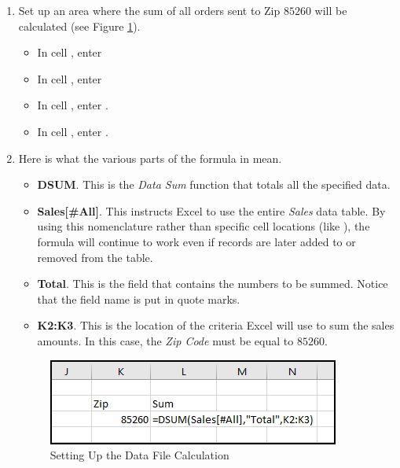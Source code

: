 \begin{enumerate}[resume]
	\item Set up an area where the sum of all orders sent to Zip $ 85260 $ will be calculated (see Figure \ref{09:fig21}).

	\begin{itemize}
		\item In cell , enter 
		\item In cell , enter 
		\item In cell , enter  . 
		\item In cell , enter . 
	\end{itemize}

	\item Here is what the various parts of the formula in  mean.		

	\begin{itemize}
		\item \textbf{DSUM}. This is the \textit{Data Sum} function that totals all the specified data.
		\item \textbf{Sales[\#All]}. This instructs Excel to use the entire \textit{Sales} data table. By using this nomenclature rather than specific cell locations (like ), the formula will continue to work even if records are later added to or removed from the table.
		\item \textbf{Total}. This is the field that contains the numbers to be summed. Notice that the field name is put in quote marks.
		\item \textbf{K2:K3}. This is the location of the criteria Excel will use to sum the sales amounts. In this case, the \textit{Zip Code} must be equal to $ 85260 $.
	\end{itemize}	

	\begin{figure}[H]
		\centering
		\includegraphics[width=\maxwidth{.75\linewidth}]{gfx/ch09_fig21}
		\caption{Setting Up the Data File Calculation}
		\label{09:fig21}
	\end{figure}


\end{enumerate}
